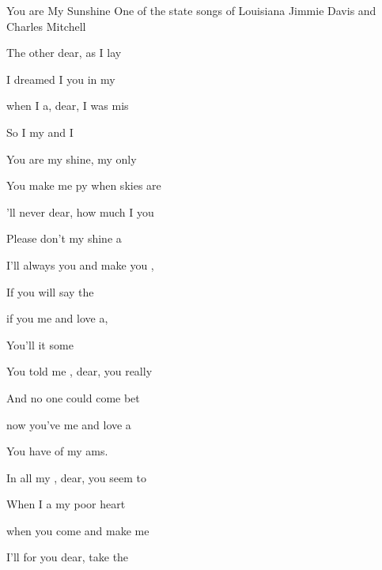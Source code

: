 \begin{SBSong}{You are My Sunshine}
  {One of the state songs of Louisiana}
  {Jimmie Davis and Charles Mitchell}
  \begin{SBVerse}
    The other  dear, as I lay 
    
    I dreamed I  you in my 

     when I a, dear, I was mis 
    
    So I  my  and I  
  \end{SBVerse}
  \begin{SBChorus}
    You are my shine, my only 
    
    You make me py when skies are 
    
    'll never  dear, how much I  you 
    
    Please don't  my shine a 
  \end{SBChorus}
  \begin{SBVerse}
    I'll always  you and make you ,
    
    If you will  say the 
    
     if you  me and love a, 
    
    You'll  it  some  
  \end{SBVerse}
  \begin{SBVerse}
    You told me , dear, you really 
    
    And no one  could come bet
    
     now you've  me and love a 
    
    You have   of my ams. 
  \end{SBVerse}
  \begin{SBVerse}
    In all my , dear, you seem to 
    
    When I a my poor heart 
    
     when you come  and make me  
    
    I'll for you dear,  take the  
  \end{SBVerse}
\end{SBSong}

